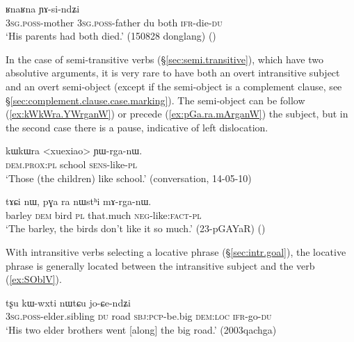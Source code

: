 \begin{exe}
	\ex \label{ex:RnaRna.YAsindZi}
	\gll [ɯ-mu ɯ-wa ni] ʁnaʁna ɲɤ-si-ndʑi \\
	\textsc{3sg}.\textsc{poss}-mother 	\textsc{3sg}.\textsc{poss}-father du both \textsc{ifr}-die-\textsc{du} \\ 
	\glt `His parents had both died.' (150828 donglang)
()
\end{exe}

In the case of semi-transitive verbs (§\ref{sec:semi.transitive}), which have two absolutive arguments, it is very rare to have both an overt intransitive subject and an overt semi-object (except if the semi-object is a complement clause, see §\ref{sec:complement.clause.case.marking}). The semi-object can be follow (\ref{ex:kWkWra.YWrganW}) or precede (\ref{ex:pGa.ra.mArganW}) the subject, but in the second case there is a pause, indicative of left dislocation.

\begin{exe}
\ex \label{ex:kWkWra.YWrganW}
\gll kɯkɯra <xuexiao> ɲɯ-rga-nɯ. \\
\textsc{dem}.\textsc{prox}:\textsc{pl} school \textsc{sens}-like-\textsc{pl} \\
\glt `Those (the children) like school.' (conversation, 14-05-10)
\end{exe}

\begin{exe}
\ex \label{ex:pGa.ra.mArganW}
\gll  tɤɕi nɯ, pɣa ra nɯstʰi mɤ-rga-nɯ. \\
barley \textsc{dem} bird \textsc{pl} that.much \textsc{neg}-like:\textsc{fact}-\textsc{pl} \\
\glt `The barley, the birds don't like it so much.' (23-pGAYaR)
()
\end{exe}

 With intransitive verbs selecting a locative phrase (§\ref{sec:intr.goal}), the locative phrase is generally located between the intransitive subject and the verb (\ref{ex:SOblV}). 

\begin{exe}
\ex \label{ex:SOblV}
\gll [ɯ-pi ni] tʂu kɯ-wxti nɯtɕu jo-ɕe-ndʑi \\
\textsc{3sg}.\textsc{poss}-elder.sibling \textsc{du} road \textsc{sbj}:\textsc{pcp}-be.big \textsc{dem}:\textsc{loc} \textsc{ifr}-go-\textsc{du} \\
\glt `His two elder brothers went [along] the big road.' (2003qachga)
\end{exe}

